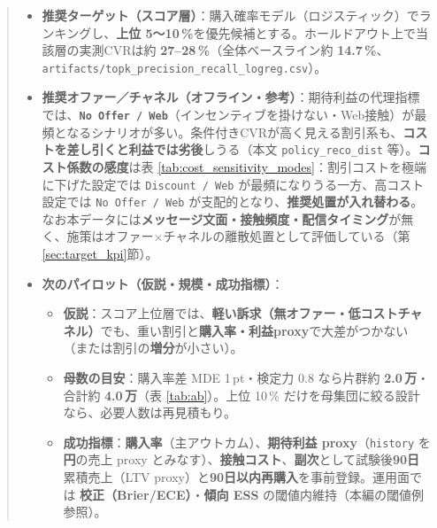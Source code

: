\begin{quote}
\small
\setlength{\parskip}{0.35em}
\begin{itemize}
  \item \textbf{推奨ターゲット（スコア層）}：購入確率モデル（ロジスティック）でランキングし、\textbf{上位 5〜10\,\%}を優先候補とする。ホールドアウト上で当該層の実測CVRは約 \textbf{27--28\,\%}（全体ベースライン約 \textbf{14.7\,\%}、\texttt{artifacts/topk\_precision\_recall\_logreg.csv}）。
  \item \textbf{推奨オファー／チャネル（オフライン・参考）}：期待利益の代理指標では、\textbf{\texttt{No Offer / Web}}（インセンティブを掛けない・Web接触）が最頻となるシナリオが多い。条件付きCVRが高く見える割引系も、\textbf{コストを差し引くと利益では劣後}しうる（本文 \texttt{policy\_reco\_dist} 等）。\textbf{コスト係数の感度}は表 \ref{tab:cost_sensitivity_modes}：割引コストを極端に下げた設定では \texttt{Discount / Web} が最頻になりうる一方、高コスト設定では \texttt{No Offer / Web} が支配的となり、\textbf{推奨処置が入れ替わる}。なお本データには\textbf{メッセージ文面・接触頻度・配信タイミング}が無く、施策はオファー$\times$チャネルの離散処置として評価している（第\ref{sec:target_kpi}節）。
  \item \textbf{次のパイロット（仮説・規模・成功指標）}：
  \begin{itemize}
    \item \textbf{仮説}：スコア上位層では、\textbf{軽い訴求（無オファー・低コストチャネル）}でも、重い割引と\textbf{購入率・利益proxy}で大差がつかない（または割引の\textbf{増分}が小さい）。
    \item \textbf{母数の目安}：購入率差 MDE 1\,pt・検定力 0.8 なら片群約 \textbf{2.0\,万}・合計約 \textbf{4.0\,万}（表 \ref{tab:ab}）。上位 10\,\% だけを母集団に絞る設計なら、必要人数は再見積もり。
    \item \textbf{成功指標}：\textbf{購入率}（主アウトカム）、\textbf{期待利益 proxy}（\texttt{history} を\textbf{円}の売上 proxy とみなす）、\textbf{接触コスト}、\textbf{副次}として試験後\textbf{90日}累積売上（LTV proxy）と\textbf{90日以内再購入}を事前登録。運用面では \textbf{校正（Brier/ECE）}・\textbf{傾向 ESS} の閾値内維持（本編の閾値例参照）。
  \end{itemize}
\end{itemize}
\end{quote}
